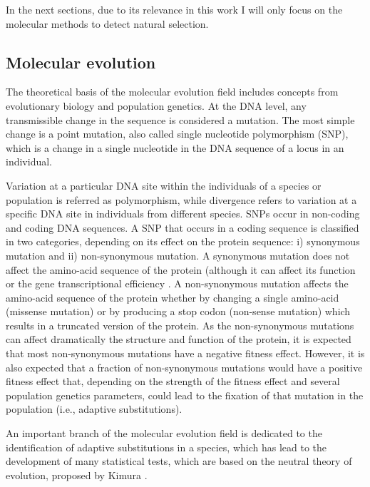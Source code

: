 In the next sections, due to its relevance in this work I will only focus on the molecular methods to detect natural selection.

\subsection{Molecular evolution}

The theoretical basis of the molecular evolution field includes concepts from evolutionary biology and population genetics. At the DNA level, any transmissible change in the sequence is considered a mutation. 
The most simple change is a point mutation, also called single nucleotide polymorphism (SNP),
which is a change in a single nucleotide in the DNA sequence of a locus in an individual.

Variation at a particular DNA site within the individuals of a species or population is referred as polymorphism, while divergence refers to variation at a specific DNA site in individuals from different species.
%
SNPs occur in non-coding and coding DNA sequences. A SNP that occurs in a coding sequence is classified in two categories, depending on its effect on the protein sequence: i) synonymous mutation and ii) non-synonymous mutation.
A synonymous mutation does not affect the amino-acid sequence of the protein (although it can affect its function 
	\citep{Kimchi-Sarfaty2007} or the gene transcriptional efficiency \citep{Xia1996}.
A non-synonymous mutation affects the amino-acid sequence of the protein whether by changing a single amino-acid (missense mutation) or by producing a stop codon (non-sense mutation) which results in a truncated version of the protein.
%
As the non-synonymous mutations can affect dramatically the structure and function of the protein, it is expected that most non-synonymous mutations have a negative fitness effect.
However, it is also expected that a fraction of non-synonymous mutations would have a positive fitness effect that, depending on the strength of the fitness effect and several population genetics parameters, could lead to the fixation of that mutation in the population (i.e., adaptive substitutions).

An important branch of the molecular evolution field is dedicated to the identification of adaptive substitutions in a species, which has lead to the development of many statistical tests, which are based on the neutral theory of evolution, proposed by Kimura
	\citep{Kimura1968}.

